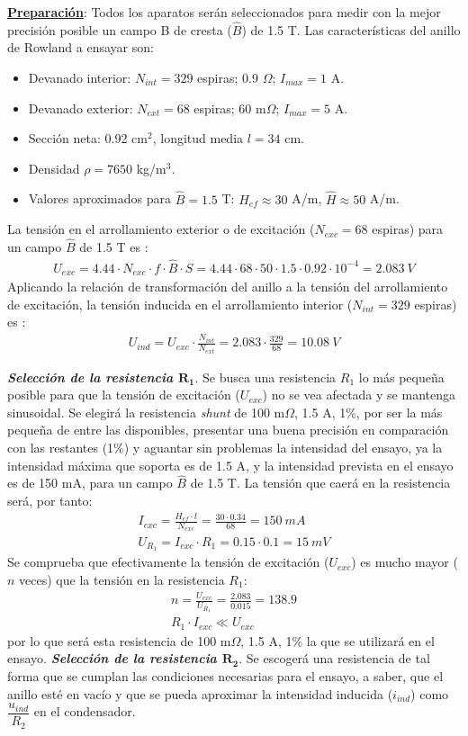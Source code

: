 \documentclass[a4paper,titlepage]{article}
\begin{document}
\noindent\textbf{\underline{Preparación}}: Todos los aparatos serán seleccionados para medir con la mejor precisión posible un campo B de cresta ($\hat{B}$) de 1.5 T. Las características del anillo de Rowland a ensayar son:
\begin{itemize}
    \item Devanado interior: $N_{int}=329$ espiras; 0.9 $\Omega$; $I_{max}=1$ A.
    \item Devanado exterior: $N_{ext}=68$ espiras; 60 m$\Omega$; $I_{max}=5$ A.
    \item Sección neta: 0.92 cm$^2$, longitud media $l=34$ cm.
    \item Densidad $\rho=7650$ kg/m$^3$.
    \item Valores aproximados para $\hat{B}=1.5$ T: $H_{ef}\approx30$ A/m, $\hat{H}\approx50$ A/m.
\end{itemize}
La tensión en el arrollamiento exterior o de excitación ($N_{exc} = 68$ espiras) para un campo $\hat{B}$ de 1.5 T es :
\begin{gather*}
    U_{exc}=4.44\cdot N_{exc}\cdot f\cdot \hat{B}\cdot S=4.44\cdot 68\cdot50\cdot1.5\cdot0.92\cdot10^{-4}= 2.083\:V
\end{gather*}
Aplicando la relación de transformación del anillo a la tensión del arrollamiento de excitación, la tensión inducida en el arrollamiento  interior ($N_{int} = 329$ espiras) es :
\begin{gather*}
    U_{ind}=U_{exc}\cdot\frac{N_{int}}{N_{ext}}=2.083\cdot\frac{329}{68}=10.08\:V
\end{gather*}

\textbf{\textit{Selección de la resistencia $\mathbf{R_1}$}}. Se busca una resistencia $R_1$ lo más pequeña posible para que la tensión de excitación ($U_{exc}$) no se vea afectada y se mantenga sinusoidal. Se elegirá la resistencia \textit{shunt} de 100 m$\Omega$, 1.5 A, 1\%, por ser la más pequeña de entre las disponibles, presentar una buena precisión en comparación con las restantes (1\%) y aguantar sin problemas la intensidad del ensayo, ya la intensidad máxima que soporta es de 1.5 A, y la intensidad prevista en el ensayo es de 150 mA, para un campo $\hat{B}$ de 1.5 T. La tensión que caerá en la resistencia será, por tanto:
\begin{gather*}
    I_{exc}=\frac{H_{ef}\cdot l}{N_{exc}}=\frac{30\cdot0.34}{68}=150\:mA\\
    U_{R_1} = I_{exc}\cdot R_1 = 0.15\cdot0.1=15\:mV
\end{gather*}
Se comprueba que efectivamente la tensión de excitación ($U_{exc}$) es mucho mayor ($n$ veces) que la tensión en la resistencia $R_1$:
\begin{gather*}
    n=\frac{U_{exc}}{U_{R_1}}= \frac{2.083}{0.015}= 138.9\\
    R_1\cdot I_{exc}\ll U_{exc}
\end{gather*}
por lo que será esta  resistencia de 100 m$\Omega$, 1.5 A, 1\% la que se utilizará en el ensayo.
\newpage
\textbf{\textit{Selección de la resistencia $\mathbf{R_2}$}}. Se escogerá una resistencia de tal forma que se cumplan las condiciones necesarias para el ensayo, a saber, que el anillo esté en vacío y que se pueda aproximar la intensidad inducida ($i_{ind}$) como $\dfrac{u_{ind}}{R_2}$ en el condensador. 
\end{document}
